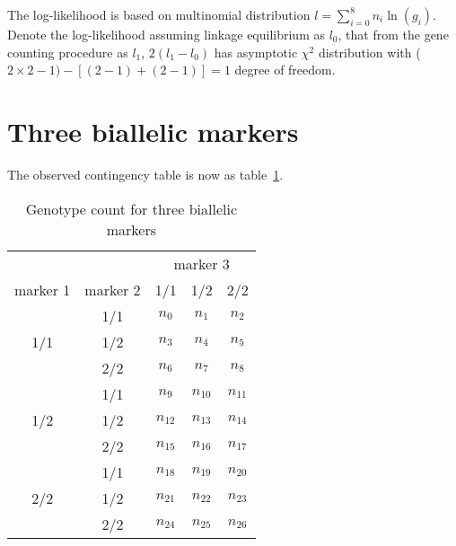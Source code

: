 The log-likelihood is based on multinomial distribution $l=\sum_{i=0}^8n_i \ln
(g_i)$.  Denote the log-likelihood assuming linkage equilibrium as $l_0$, that
from the gene counting procedure as $l_1$, $2(l_1-l_0)$ has asymptotic $\chi^2$
distribution with ($2\times 2-1)-[(2-1)+(2-1)]=1$ degree of freedom.


\section*{Three biallelic markers}

The observed contingency table is now as table~\ref{threethreen}.

\begin{table}[h]
\centering
\caption{Genotype count for three biallelic markers\label{threethreen}}
\vskip 0.3cm
\begin{tabular}{ccccc}
\hline
 & & \multicolumn{3}{c}{marker 3} \\ \cline{3-5}
marker 1&marker 2&1/1 & 1/2 & 2/2 \\
\hline
     & 1/1 & $n_0$ & $n_1$ & $n_2$ \\
1/1  & 1/2 & $n_3$ & $n_4$ & $n_5$ \\
     & 2/2 & $n_6$ & $n_7$ & $n_8$ \\
     & 1/1 & $n_9$ & $n_{10}$ & $n_{11}$ \\
1/2  & 1/2 & $n_{12}$ & $n_{13}$ & $n_{14}$ \\
     & 2/2 & $n_{15}$ & $n_{16}$ & $n_{17}$ \\
     & 1/1 & $n_{18}$ & $n_{19}$ & $n_{20}$ \\
2/2  & 1/2 & $n_{21}$ & $n_{22}$ & $n_{23}$ \\
     & 2/2 & $n_{24}$ & $n_{25}$ & $n_{26}$ \\
\hline
\end{tabular}
\end{table}

